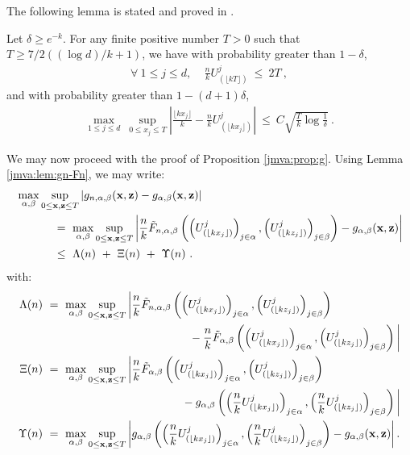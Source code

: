 The following lemma is stated and proved in \cite{COLT15}.
\begin{lemma}
\label{jmva:lem:U-x} 
Let $\delta\ge e^{-k}$. For any finite positive number $T>0$ such that $T \ge 7/2((\log d)/k + 1)$, we have with probability greater than $1 - \delta$, 
\begin{align}
\label{jmva:lem:eq-Wellner}
\forall~ 1\le j \le d,~~~~~\frac{n}{k} U_{(\lfloor kT\rfloor )}^j ~\le~ 2T~,
\end{align}
and with probability greater than $1- (d+1)\delta$, 
\begin{align*}
\max_{1 \le j \le d}~ \sup_{0 \le x_j \le T} \left| \frac{\lfloor kx_j\rfloor }{k} - \frac{n}{k} U_{(\lfloor kx_j\rfloor )}^j  \right| ~\le~ C\sqrt{\frac{T}{k}\log{\frac{1}{\delta}}}~.
\end{align*}
\end{lemma}
\noindent
We may now proceed with the proof of Proposition \ref{jmva:prop:g}.
Using Lemma \ref{jmva:lem:gn-Fn}, we may write:
\begin{align}
\nonumber &\max_{\alpha, \beta}\sup_{ 0 \le \mathbf x, \mathbf z \le T }
 \left| g_{n, \alpha, \beta}(\mathbf x, \mathbf z) - g_{\alpha, \beta}(\mathbf x, \mathbf z) \right| \\
\nonumber           &~~~~~~~~~~=~ \max_{\alpha, \beta}  \sup_{ 0 \le \mathbf x, \mathbf z \le T } \left| \frac{n}{k} \tilde F_{n, \alpha, \beta} \left( \left(U_{(\lfloor kx_j\rfloor)}^j\right)_{j \in \alpha} , \left(U_{(\lfloor kz_j\rfloor)}^j\right)_{j \in \beta} \right) - g_{\alpha, \beta}(\mathbf x, \mathbf z) \right| \\
\label{jmva:proof_decomp}&~~~~~~~~~~\le~ \Lambda(n) ~+~ \Xi(n) ~+~ \Upsilon(n)~.
\end{align}
with:
\begin{align*}
 \Lambda(n) &~=~ \max_{\alpha, \beta} \sup_{ 0 \le \mathbf x, \mathbf z \le T } \bigg| \frac{n}{k} \tilde F_{n, \alpha, \beta} \left(\left(U_{(\lfloor kx_j\rfloor)}^j\right)_{j \in \alpha} , \left(U_{(\lfloor kz_j\rfloor)}^j\right)_{j \in \beta} \right) 
\\&~~~~~~~~~~~~~~~~~~~~~~~~~~~~~~~~~~~~~~~- \frac{n}{k} \tilde F_{\alpha, \beta} \left(\left(U_{(\lfloor kx_j\rfloor)}^j\right)_{j \in \alpha} , \left(U_{(\lfloor kz_j\rfloor)}^j\right)_{j \in \beta} \right)  \bigg|\\
\Xi(n) &~=~\max_{\alpha, \beta} \sup_{0 \le \mathbf x, \mathbf z \le T} \bigg| \frac{n}{k} \tilde F_{\alpha, \beta} \left(\left(U_{(\lfloor kx_j\rfloor)}^j\right)_{j \in \alpha} , \left(U_{(\lfloor kz_j\rfloor)}^j\right)_{j \in \beta} \right)
\\&~~~~~~~~~~~~~~~~~~~~~~~~~~~~~~~~~~~~~- g_{\alpha, \beta}\left(\left(\frac{n}{k}U_{(\lfloor kx_j\rfloor)}^j\right)_{j \in \alpha} , \left(\frac{n}{k}U_{(\lfloor kz_j\rfloor)}^j\right)_{j \in \beta}\right) \bigg|\\
\Upsilon(n) &~=~ \max_{\alpha, \beta} \sup_{ 0 \le \mathbf x, \mathbf z \le T } \left| g_{\alpha, \beta}\left(\left(\frac{n}{k}U_{(\lfloor kx_j\rfloor)}^j\right)_{j \in \alpha} , \left(\frac{n}{k}U_{(\lfloor kz_j\rfloor)}^j\right)_{j \in \beta}\right) - g_{\alpha, \beta}(\mathbf x, \mathbf z) \right|.
\end{align*}
